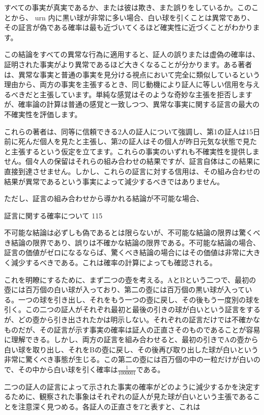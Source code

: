 \documentclass[a4paper,11pt,openany]{ltjsbook}
\begin{document}
すべての事実が真実であるか、または彼は欺き、また誤りをしているか。このことから、 urn 内に黒い球が非常に多い場合、白い球を引くことは異常であり、その証言が偽である確率は最も近づいてくるほど確実性に近づくことがわかります。

この結論をすべての異常な行為に適用すると、証人の誤りまたは虚偽の確率は、証明された事実がより異常であるほど大きくなることが分かります。ある著者は、異常な事実と普通の事実を見分ける視点において完全に類似しているという理由から、両方の事実を主張するとき、同じ動機により証人に等しい信用を与えるべきだと主張しています。単純な感覚はそのような奇妙な主張を拒否しますが、確率論の計算は普通の感覚と一致しつつ、異常な事実に関する証言の最大の不確実性を評価します。

これらの著者は、同等に信頼できる2人の証人について強調し、第1の証人は15日前に死んだ個人を見たと主張し、第2の証人はその個人が昨日元気な状態で見たと主張するという仮定を立てます。これらの事実のいずれも不確実性を提供しません。個々人の保留はそれらの組み合わせの結果ですが、証言自体はこの結果に直接到達させません。しかし、これらの証言に対する信用は、その組み合わせの結果が異常であるという事実によって減少するべきではありません。

ただし、証言の組み合わせから導かれる結論が不可能な場合、

証言に関する確率について
115

不可能な結論は必ずしも偽であるとは限らないが、不可能な結論の限界は驚くべき結論の限界であり、誤りは不確かな結論の限界である。不可能な結論の場合、証言の価値がゼロになるならば、驚くべき結論の場合にはその価値は非常に大きく減少するべきである。これは確率の計算によっても確認される。

これを明瞭にするために、まず二つの壺を考える。AとBという二つで、最初の壺には百万個の白い球が入っており、第二の壺には百万個の黒い球が入っている。一つの球を引き出し、それをもう一つの壺に戻し、その後もう一度別の球を引く。この二つの証人がそれぞれ最初と最後の引きの球が白いという証言をするが、どの壺から引き出されたかは明示しない。それぞれの証言だけでは不確かなものだが、その証言が示す事実の確率は証人の正直さそのものであることが容易に理解できる。しかし、両方の証言を組み合わせると、最初の引きでAの壺から白い球を取り出し、それをBの壺に戻し、その後再び取り出した球が白いという非常に驚くべき事態が生じる。この第二の壺には百万個の中の一粒だけが白いので、その中から白い球を引く確率は$\frac{1}{1000001}$である。

二つの証人の証言によって示された事実の確率がどのように減少するかを決定するために、観察された事象はそれぞれの証人が見た球が白いという主張であることを注意深く見つめる。各証人の正直さを$T$と表すと、これは
\end{document}
